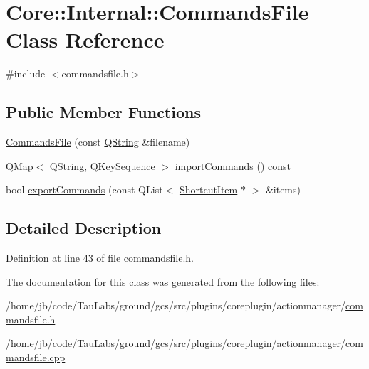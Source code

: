 \hypertarget{class_core_1_1_internal_1_1_commands_file}{\section{\-Core\-:\-:\-Internal\-:\-:\-Commands\-File \-Class \-Reference}
\label{class_core_1_1_internal_1_1_commands_file}
}


{\ttfamily \#include $<$commandsfile.\-h$>$}

\subsection*{\-Public \-Member \-Functions}
\begin{DoxyCompactItemize}
\item 
\hyperlink{group___core_plugin_gaf5614402a98456713ff6873300bdaf43}{\-Commands\-File} (const \hyperlink{group___u_a_v_objects_plugin_gab9d252f49c333c94a72f97ce3105a32d}{\-Q\-String} \&filename)
\item 
\-Q\-Map$<$ \hyperlink{group___u_a_v_objects_plugin_gab9d252f49c333c94a72f97ce3105a32d}{\-Q\-String}, \-Q\-Key\-Sequence $>$ \hyperlink{group___core_plugin_ga3ffad3704d00bf33b20fdc4ab113cb92}{import\-Commands} () const 
\item 
bool \hyperlink{group___core_plugin_ga72b125d5736f93bdc1a42939e063d350}{export\-Commands} (const \-Q\-List$<$ \hyperlink{struct_core_1_1_internal_1_1_shortcut_item}{\-Shortcut\-Item} $\ast$ $>$ \&items)
\end{DoxyCompactItemize}


\subsection{\-Detailed \-Description}


\-Definition at line 43 of file commandsfile.\-h.



\-The documentation for this class was generated from the following files\-:\begin{DoxyCompactItemize}
\item 
/home/jb/code/\-Tau\-Labs/ground/gcs/src/plugins/coreplugin/actionmanager/\hyperlink{commandsfile_8h}{commandsfile.\-h}\item 
/home/jb/code/\-Tau\-Labs/ground/gcs/src/plugins/coreplugin/actionmanager/\hyperlink{commandsfile_8cpp}{commandsfile.\-cpp}\end{DoxyCompactItemize}
